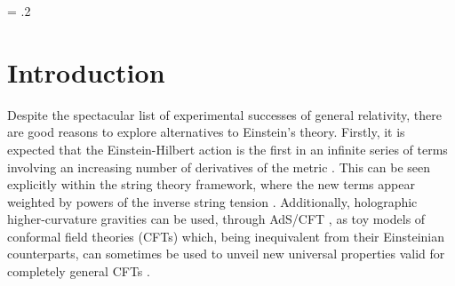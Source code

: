 \documentclass[11pt]{article}
\begin{document}
\begin{titlepage}
\begin{center}
\begin{abstract}
\end{abstract}
\end{center}
\end{titlepage}

\setcounter{tocdepth}{2}


{\parskip = .2\baselineskip \tableofcontents}












\section{Introduction}
\label{sec:Introduction}

Despite the spectacular list of experimental successes of general relativity, there are good reasons to explore alternatives to Einstein's theory. Firstly, it is expected that the Einstein-Hilbert action is the first in an infinite series of terms involving an increasing number of derivatives of the metric \cite{Endlich:2017tqa}. %
This can be seen explicitly within the string theory framework, where the new terms appear weighted by powers of the inverse string tension  \cite{Gross:1986mw,Green:1997tv,Frolov:2001xr}. Additionally, holographic higher-curvature gravities can be used, through AdS/CFT \cite{Maldacena,Witten}, as toy models of conformal field theories (CFTs) which, being inequivalent from their Einsteinian counterparts, can sometimes be used to unveil new universal properties valid for completely general CFTs \cite{Kats:2007mq,Brigante:2007nu,Buchel:2008ae,Myers:2010xs,Camanho:2010ru,Mezei:2014zla,Bueno1,Bueno:2018yzo,Bueno:2022jbl}.
\end{document}
